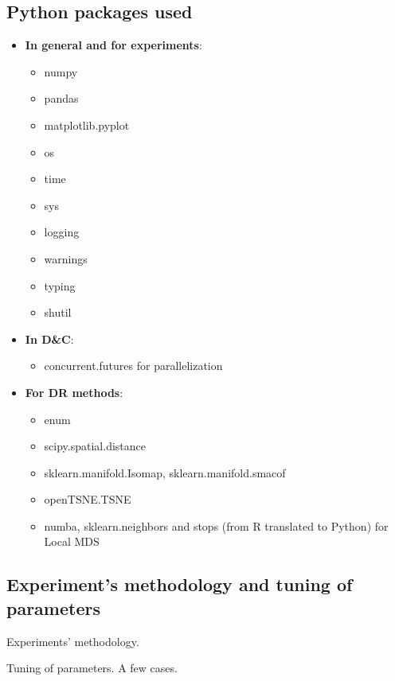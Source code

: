 \subsection{Python packages used}

\begin{itemize}
    \item \textbf{In general and for experiments}: \begin{itemize}
        \item numpy
        \item pandas
        \item matplotlib.pyplot
        \item os
        \item time
        \item sys
        \item logging
        \item warnings
        \item typing
        \item shutil
    \end{itemize}
    \item \textbf{In D\&C}: \begin{itemize}
        \item concurrent.futures for parallelization
    \end{itemize}

    \item \textbf{For DR methods}: \begin{itemize}
        \item enum
        \item scipy.spatial.distance
        \item sklearn.manifold.Isomap, sklearn.manifold.smacof
        \item openTSNE.TSNE
        \item numba, sklearn.neighbors and stops (from R translated to Python) for Local MDS
    \end{itemize}
\end{itemize}

\subsection{Experiment's methodology and tuning of parameters}

Experiments' methodology.

Tuning of parameters. A few cases.